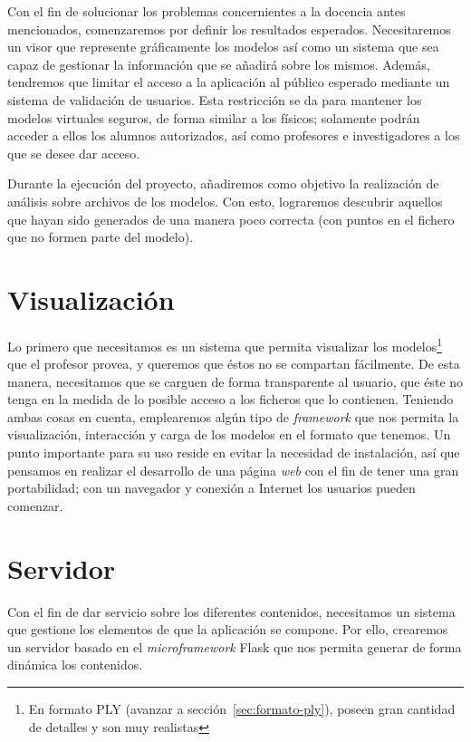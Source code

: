 
Con el fin de solucionar los problemas concernientes a la docencia antes mencionados, comenzaremos por definir los resultados esperados. Necesitaremos un visor que represente gráficamente los modelos así como un sistema que sea capaz de gestionar la información que se añadirá sobre los mismos. Además, tendremos que limitar el acceso a la aplicación al público esperado mediante un sistema de validación de usuarios. Esta restricción se da para mantener los modelos virtuales seguros, de forma similar a los físicos; solamente podrán acceder a ellos los alumnos autorizados, así como profesores e investigadores a los que se desee dar acceso.

Durante la ejecución del proyecto, añadiremos como objetivo la realización de análisis sobre archivos de los modelos. Con esto, lograremos descubrir aquellos que hayan sido generados de una manera poco correcta (con puntos en el fichero que no formen parte del modelo).

\section{Visualización}
Lo primero que necesitamos es un sistema que permita visualizar los modelos\footnote{En formato PLY (avanzar a sección~\ref{sec:formato-ply}), poseen gran cantidad de detalles y son muy realistas} que el profesor provea, y queremos que éstos no se compartan fácilmente. De esta manera, necesitamos que se carguen de forma transparente al usuario, que éste no tenga en la medida de lo posible acceso a los ficheros que lo contienen. Teniendo ambas cosas en cuenta, emplearemos algún tipo de \textit{framework} que nos permita la visualización, interacción y carga de los modelos en el formato que tenemos. Un punto importante para su uso reside en evitar la necesidad de instalación, así que pensamos en realizar el desarrollo de una página \textit{web} con el fin de tener una gran portabilidad; con un navegador y conexión a Internet los usuarios pueden comenzar.

\section{Servidor}
Con el fin de dar servicio sobre los diferentes contenidos, necesitamos un sistema que gestione los elementos de que la aplicación se compone. Por ello, crearemos un servidor basado en el \textit{microframework} Flask que nos permita generar de forma dinámica los contenidos.

